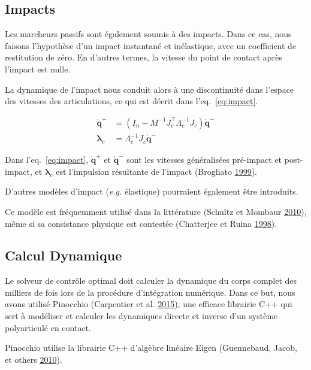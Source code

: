 \documentclass[french,A4paper,]{book}
\begin{document}
\subsection{Impacts}\label{impacts}

Les marcheurs passifs sont également soumis à des impacts. Dans ce cas,
nous faisons l'hypothèse d'un impact instantané et inélastique, avec un
coefficient de restitution de zéro. En d'autres termes, la vitesse du
point de contact après l'impact est nulle.

La dynamique de l'impact nous conduit alors à une discontinuité dans
l'espace des vitesses des articulations, ce qui est décrit dans
l'eq.~\ref{eq:impact}.

\begin{equation}\begin{aligned}
    \bm{\dot q^+} &= (I_n-M^{-1}J_c^\top\Lambda_c^{-1}J_c)\bm{\dot q^-} \\
    \bm\lambda_c &= \Lambda_c^{-1}J_c\bm{\dot q^-}
\end{aligned} \label{eq:impact}\end{equation}

Dans l'eq.~\ref{eq:impact}, \(\bm{\dot q^+}\) et \(\bm{\dot q^-}\) sont
les vitesses généralisées pré-impact et post-impact, et \(\bm\lambda_c\)
est l'impulsion résultante de l'impact (Brogliato
\protect\hyperlink{ref-brogliato99}{1999}).

D'autres modèles d'impact (\emph{e.g.} élastique) pourraient également
être introduits.

Ce modèle est fréquemment utilisé dans la littérature (Schultz et
Mombaur \protect\hyperlink{ref-schultz10}{2010}), même si sa consistance
physique est contestée (Chatterjee et Ruina
\protect\hyperlink{ref-chatterjee98}{1998}).

\subsection{Calcul Dynamique}\label{calcul-dynamique}

Le solveur de contrôle optimal doit calculer la dynamique du corps
complet des milliers de fois lors de la procédure d'intégration
numérique. Dans ce but, nous avons utilisé Pinocchio (Carpentier et al.
\protect\hyperlink{ref-pinocchioweb}{2015}), une efficace librairie C++
qui sert à modéliser et calculer les dynamiques directe et inverse d'un
système polyarticulé en contact.

Pinocchio utilise la librairie C++ d'algèbre linéaire Eigen (Guennebaud,
Jacob, et others \protect\hyperlink{ref-eigenweb}{2010}).
\end{document}
